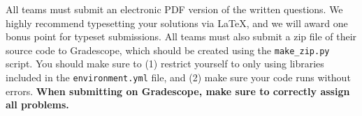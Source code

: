 All teams must submit an electronic PDF version of the written questions. We
highly recommend typesetting your solutions via \LaTeX, and we will award one bonus point for typeset submissions. 
All teams must also submit a zip file of
their source code to Gradescope, which should be created using the
\texttt{make\_zip.py} script. You
should make sure to (1) restrict yourself to only using libraries included in
the
\texttt{environment.yml} file, and (2) make sure your code runs without errors.
\textbf{When submitting on Gradescope, make sure to correctly assign all problems.}



